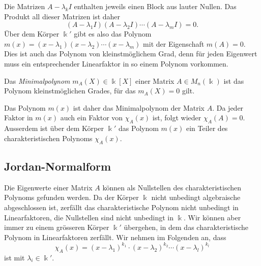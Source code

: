 Die Matrizen $A-\lambda_kI$ enthalten jeweils einen Block aus lauter
Nullen.
Das Produkt all dieser Matrizen  ist daher
\[
(A-\lambda_1I)
(A-\lambda_2I)
\cdots
(A-\lambda_mI)
=
0.
\]
Über dem Körper $\Bbbk'$ gibt es also das Polynom
$m(x)=(x-\lambda_1)(x-\lambda_2)\cdots(x-\lambda_m)$ mit der Eigenschaft
$m(A)=0$.
Dies ist auch das Polynom von kleinstmöglichem Grad, denn für jeden
Eigenwert muss ein entsprechender Linearfaktor in so einem Polynom vorkommen.

\begin{definition}
\label{buch:normalformen:def:minimalpolynom}
Das {\em Minimalpolynom} $m_A(X)\in\Bbbk[X]$ einer Matrix
$A\in M_{n}(\Bbbk)$ ist das Polynom kleinstmöglichen Grades, für
das $m_A(X)=0$ gilt.
\end{definition}

Das Polynom $m(x)$ ist daher das Minimalpolynom der Matrix $A$.
Da jeder Faktor in $m(x)$ auch ein Faktor von $\chi_A(x)$ ist,
folgt wieder $\chi_A(A)=0$.
Ausserdem ist über dem Körper $\Bbbk'$ das Polynom $m(x)$ ein Teiler
des charakteristischen Polynoms $\chi_A(x)$.

\subsection{Jordan-Normalform
\label{buch:subsection:jordan-normalform}}
%
Die Eigenwerte einer Matrix $A$ können als Nullstellen des 
charakteristischen Polynoms gefunden werden.
Da der Körper $\Bbbk$ nicht unbedingt algebraische abgeschlossen ist,
zerfällt das charakteristische Polynom nicht unbedingt in Linearfaktoren,
die Nullstellen sind nicht unbedingt in $\Bbbk$.
Wir können aber immer zu einem grösseren Körper $\Bbbk'$ übergehen,
in dem das charakteristische Polynom in Linearfaktoren zerfällt.
Wir nehmen im Folgenden an, dass 
\[
\chi_A(x)
=
(x-\lambda_1)^{k_1}
\cdot
(x-\lambda_2)^{k_2}
\cdots
(x-\lambda_l)^{k_l}
\]
ist mit $\lambda_i\in\Bbbk'$.


